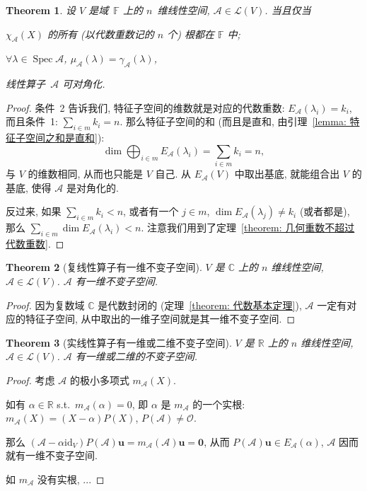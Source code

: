 \documentclass[openany]{ctexbook}
\theoremstyle{plain}
\newtheorem{theorem}{Theorem}[section] %
\theoremstyle{definition}
\newcommand*{\bv}{\boldsymbol} %
\newcommand*{\id}{\mathrm{id}} %
\DeclareMathOperator{\Spec}{Spec}
\begin{document}
\begin{theorem}
	设 $V$ 是域~$\mathbb F$ 上的 $n$~维线性空间, $\mathscr A \in \mathcal L(V)$.
	当且仅当 \begin{enumerate*}
		\item $\chi_\mathscr A(X)$ 的所有 (以代数重数记的 $n$ 个) 根都在 $\mathbb F$ 中;
		\item $\forall \lambda \in \Spec \mathscr A$, $\mu_\mathscr A(\lambda) = \gamma_\mathscr A(\lambda)$,
	\end{enumerate*}
	线性算子~$\mathscr A$ 可对角化.
\end{theorem}
\begin{proof}
	条件~2 告诉我们, 特征子空间的维数就是对应的代数重数: $E_\mathscr A(\lambda_i) = k_i$, 而且条件~1: $\sum_{i \in m} k_i = n$.
	那么特征子空间的和 (而且是直和, 由引理~\ref{lemma: 特征子空间之和是直和}):
	\begin{equation*}
		\dim \bigoplus_{i \in m} E_\mathscr A(\lambda_i) = \sum_{i \in m}k_i = n,
	\end{equation*}
	与 $V$ 的维数相同, 从而也只能是 $V$ 自己. 
	从 $E_\mathscr A(V)$ 中取出基底, 就能组合出 $V$ 的基底, 使得 $\mathscr A$ 是对角化的.

	反过来, 如果 $\sum_{i \in m} k_i < n$, 或者有一个 $j \in m$, $\dim E_\mathscr A(\lambda_j) \neq k_i$ (或者都是), 那么 $\sum_{i \in m} \dim E_\mathscr A(\lambda_i) < n$. 
	注意我们用到了定理~\ref{theorem: 几何重数不超过代数重数}.
\end{proof}

\begin{theorem}[复线性算子有一维不变子空间]
	$V$ 是 $\mathbb C$ 上的 $n$ 维线性空间, $\mathscr A \in \mathcal L(V)$. 
	$\mathscr A$ 有一维不变子空间.
\end{theorem}
\begin{proof}
	因为复数域 $\mathbb C$ 是代数封闭的 (定理~\ref{theorem: 代数基本定理}), $\mathscr A$ 一定有对应的特征子空间, 从中取出的一维子空间就是其一维不变子空间.
\end{proof}

\begin{theorem}[实线性算子有一维或二维不变子空间]
	$V$ 是 $\mathbb R$ 上的 $n$ 维线性空间, $\mathscr A \in \mathcal L(V)$. 
	$\mathscr A$ 有一维或二维的不变子空间.
\end{theorem}
\begin{proof}
	考虑 $\mathscr A$ 的极小多项式 $m_\mathscr A(X)$.

	如有 $\alpha \in \mathbb R$ s.t.\ $m_\mathscr A(\alpha) = 0$, 即 $\alpha$ 是 $m_\mathscr A$ 的一个实根: $m_\mathscr A(X) = (X - \alpha) P(X)$, $P(\mathscr A) \neq \mathscr O$.

	那么 $(\mathscr A - \alpha \id_V) P(\mathscr A) \bv u = m_\mathscr A(\mathscr A) \bv u = \bv 0$, 从而 $P(\mathscr A) \bv u \in E_\mathscr A(\alpha)$, $\mathscr A$ 因而就有一维不变子空间.

	如 $m_\mathscr A$ 没有实根, ...%
\end{proof}
\end{document}
